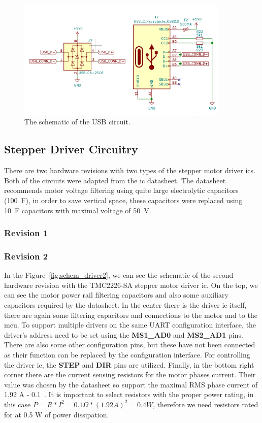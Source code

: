 \begin{figure}[H]
    \centering
    \includegraphics[width=0.9\textwidth]{obrazky/schem_usb}
    \caption{The schematic of the USB circuit.}
    \label{fig:schem_usb}
\end{figure}

\subsection{Stepper Driver Circuitry}
\label{subsec:stepper_circuitry}
There are two hardware revisions with two types of the stepper motor driver \acs{ic}s.
Both of the circuits were adapted from the \acs{ic} datasheet\cite{trinamic_tmc2100-datasheet_2018, trinamic_tmc2226_2020}.
The datasheet recommends motor voltage filtering using quite large electrolytic capacitors (100~\textmu F), in order to save vertical space, these capacitors were replaced using 10~\textmu F capacitors with maximal voltage of 50~V.

\subsubsection{Revision 1}
\subsubsection{Revision 2}
In the Figure~\ref{fig:schem_driver2}, we can see the schematic of the second hardware revision with the TMC2226-SA stepper motor driver \acs{ic}.
On the top, we can see the motor power rail filtering capacitors and also some auxiliary capacitors required by the datasheet.
In the center there is the driver \acs{ic} itself, there are again some filtering capacitors and connections to the motor and to the \acs{mcu}.
To support multiple drivers on the same UART configuration interface, the driver's address need to be set using the \textbf{MS1\_AD0} and \textbf{MS2\_AD1} pins.
There are also some other configuration pins, but these have not been connected as their function can be replaced by the configuration interface.
For controlling the driver \acs{ic}, the \textbf{STEP} and \textbf{DIR} pins are utilized.
Finally, in the bottom right corner there are the current sensing resistors for the motor phases current.
Their value was chosen by the datasheet so support the maximal RMS phase current of 1.92 A - 0.1~\textohm.
It is important to select resistors with the proper power rating, in this case $P = R*I^2 = 0.1\Omega * (1.92 A)^2 = 0.4 W$, therefore we need resistors rated for at 0.5 W of power dissipation.

